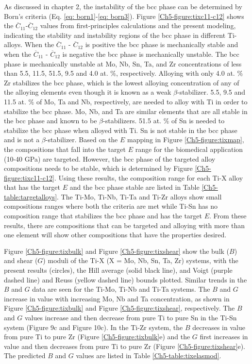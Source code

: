 As discussed in chapter 2, the instability of the bcc phase can be determined by Born's criteria (Eq. \ref{eq: born1}-\ref{eq: born3}). Figure \ref{Ch5-figure:tixc11-c12} shows the $\overline{C}_{11}$-$\overline{C}_{12}$ values from first-principles calculations and the present modeling, indicating the stability and instability regions of the bcc phase in different Ti-alloys. When the $\overline{C}_{11}$ - $\overline{C}_{12}$ is positive the bcc phase is mechanically stable and when the $\overline{C}_{11}$ - $\overline{C}_{12}$ is negative the bcc phase is mechanically unstable. The bcc phase is mechanically unstable at Mo, Nb, Sn, Ta, and Zr concentrations of less than 5.5, 11.5, 51.5, 9.5 and 4.0 at. \%, respectively. Alloying with only 4.0 at. \% Zr stabilizes the bcc phase, which is the lowest alloying concentration of any of the alloying elements even though it is known as a weak $\beta$-stabilizer. 5.5, 9.5 and 11.5 at. \% of Mo, Ta and Nb, respectively, are needed to alloy with Ti in order to stabilize the bcc phase. Mo, Nb, and Ta are similar elements that are all stable in the bcc phase and known to be $\beta$-stabilizers. 51.5 at. \% of Sn is needed to stabilize the bcc phase when alloyed with Ti. Sn is not stable in the bcc phase and is not a $\beta$-stabilizer. Based on the $E$ mapping in Figure \ref{Ch5-figure:tixmap}, the compositions that fall into the target $E$ range for the biomedical application (10-40 GPa) are targeted. However, the bcc phase of the targeted alloy compositions needs to be stable, which is determined by Figure \ref{Ch5-figure:tixc11-c12}. Using these results, the composition range for each Ti-X alloy that has the target $E$ and the bcc phase stable are listed in Table \ref{Ch5-table:targetalloys}. The Ti-Mo, Ti-Nb, Ti-Ta and Ti-Zr alloys show small compositions ranges where both the criteria are met while Ti-Sn has no composition range that stabilizes the bcc phase and has the target $E$. From these results, there are compositions that can be targeted and alloying with more than one element will show other compositions that have the properties desired. 

Figure \ref{Ch5-figure:tixbulk} and Figure \ref{Ch5-figure:tixshear} show the bulk ($B$) and shear ($G$) moduli of the Ti-X (X = Mo, Nb, Sn, Ta, Zr) systems, with the present results (circles), the Hill average (solid black line), and Voigt (purple dashed line) and Reuss (yellow dashed line) bounds plotted. Similar trends in the $B$ and $G$ data are seen for the Ti-Mo, Ti-Nb and Ti-Ta systems. The $B$ and $G$ increase in value with increasing Mo, Nb and Ta concentration, as shown in Figure \ref{Ch5-figure:tixbulk} and Figure \ref{Ch5-figure:tixshear}, respectively. The $B$ and $G$ values increase and then decrease from pure Ti to pure Sn in the Ti-Sn system (Figure 9c and Figure 10c). In the Ti-Zr system, the $B$ decreases in value from pure Ti to pure Zr (Figure \ref{Ch5-figure:tixbulk}e) and the $G$ first increases in value and then decreases from pure Ti to pure Zr (Figure \ref{Ch5-figure:tixshear}e). The predicted $B$ and $G$ values are listed in Table \ref{Ch5-table:tixelasmod}. 

